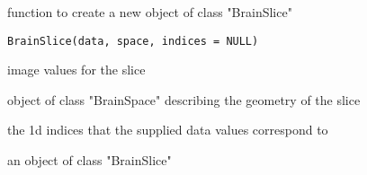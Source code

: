 \begin{Description}\relax
function to create a new object of class "BrainSlice"
\end{Description}
\begin{Usage}
\begin{verbatim}
BrainSlice(data, space, indices = NULL)
\end{verbatim}
\end{Usage}
\begin{Arguments}
\begin{ldescription}
\item[\code{data}] image values for the slice 
\item[\code{space}] object of class "BrainSpace" describing the geometry of
the slice 
\item[\code{indices}] the 1d indices that the supplied data values
correspond to 
\end{ldescription}
\end{Arguments}
\begin{Value}
an object of class "BrainSlice"
\end{Value}

